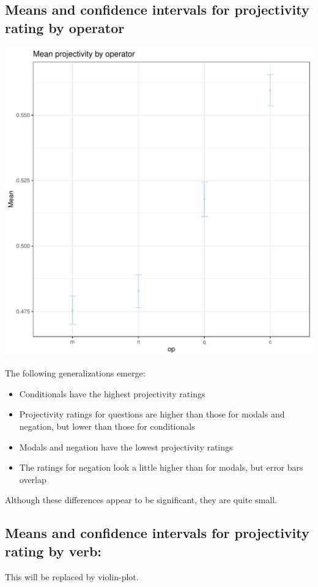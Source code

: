 \documentclass[10pt]{article}\usepackage[]{graphicx}\usepackage[dvipsnames]{xcolor}
\newenvironment{knitrout}{}{} %
\begin{document}
\subsection{Means and confidence intervals for projectivity rating by operator}
\begin{knitrout}
\color{fgcolor}

{\centering \includegraphics[width=.6\textwidth]{figures/figuressummary-op-1} 

}


\end{knitrout}

\noindent The following generalizations emerge:
\begin{itemize}
  \item Conditionals have the highest projectivity ratings
  \item Projectivity ratings for questions are higher than those for modals and negation, but lower than those for conditionals
  \item Modals and negation have the lowest projectivity ratings
  \item The ratings for negation look a little higher than for modals, but error bars overlap
\end{itemize}

\noindent Although these differences appear to be significant, they are quite small.\\

\newpage
\subsection{Means and confidence intervals for projectivity rating by verb:}
This will be replaced by violin-plot.
% 
% 
\end{document}
